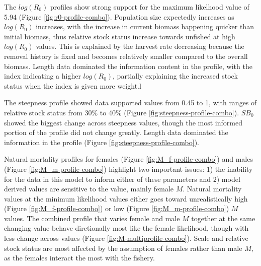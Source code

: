 \documentclass[11pt,
  english,
  a4paper,
]{article}
\begin{document}
The {\(log(R_0)\)\leavevmode\tagmcend\tagstructend} profiles show strong support for the maximum likelhood value of 5.94 (Figure \ref{fig:r0-profile-combo}). Population size expectedly increases as {\(log(R_0)\)\leavevmode\tagmcend\tagstructend} increases, with the increase in current biomass happening quicker than initial biomass, thus relative stock status increase towards unfished at high {\(log(R_0)\)\leavevmode\tagmcend\tagstructend} values. This is explained by the harvest rate decreasing because the removal history is fixed and becomes relatively smaller compared to the overall biomass. Length data dominated the information content in the profile, with the index indicating a higher {\(log(R_0)\)\leavevmode\tagmcend\tagstructend}, partially explaining the increased stock status when the index is given more weight.l

\leavevmode\tagmcend\tagstructend\par


The steepness profile showed data supported values from 0.45 to 1, with ranges of relative stock status from 30\% to 40\% (Figure \ref{fig:steepness-profile-combo}). {\(SB_0\)\leavevmode\tagmcend\tagstructend} showed the biggest change across steepness values, though the most informed portion of the profile did not change greatly. Length data dominated the information in the profile (Figure \ref{fig:steepness-profile-combo}).

\leavevmode\tagmcend\tagstructend\par


Natural mortality profiles for females (Figure \ref{fig:M_f-profile-combo}) and males (Figure \ref{fig:M_m-profile-combo}) highlight two important issues: 1) the inability for the data in this model to inform either of these parameters and 2) model derived values are sensitive to the value, mainly female {\(M\)\leavevmode\tagmcend\tagstructend}. Natural mortality values at the minimum likelihood values either goes toward unrealistically high (Figure \ref{fig:M_f-profile-combo}) or low (Figure \ref{fig:M_m-profile-combo}) {\(M\)\leavevmode\tagmcend\tagstructend} values. The combined profile that varies female and male {\(M\)\leavevmode\tagmcend\tagstructend} together at the same changing value behave diretionally most like the female likelihood, though with less change across values (Figure \ref{fig:M-multiprofile-combo}). Scale and relative stock status are most affected by the assumption of females rather than male {\(M\)\leavevmode\tagmcend\tagstructend}, as the females interact the most with the fishery.
\end{document}
